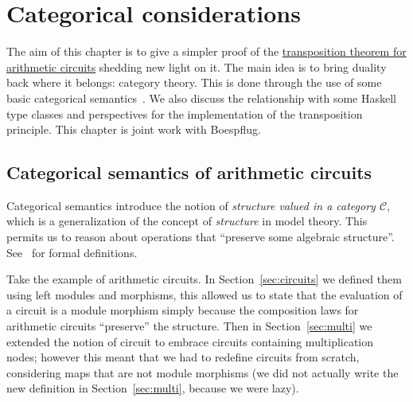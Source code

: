 

\chapter{Categorical considerations}
\label{cha:basic-categ-theory}

\renewcommand{\C}{\mathcal{C}}
\newcommand{\D}{\mathcal{D}}
\newcommand{\Set}{\mathbold{S\kern-0.2ex e\kern-0.2ex t}}
\newcommand{\Hask}{\mathbold{H\kern-0.2ex a\kern-0.2ex s\kern-0.2ex k}}
\newcommand{\RMod}[1]{#1\mathbold{-M\kern-0.2ex o\kern-0.2ex d}}

The aim of this chapter is to give a simpler proof of the
\hyperref[th:tellegen]{transposition theorem for arithmetic circuits}
shedding new light on it. The main idea is to bring duality back where
it belongs: category theory. This is done through the use of some
basic categorical semantics~\cite{pitts01,asperti+longo}. We also
discuss the relationship with some Haskell type classes and
perspectives for the implementation of the transposition
principle. This chapter is joint work with Boespflug.



\section{Categorical semantics of arithmetic circuits}
\label{sec:categ-semant-arithm}
Categorical semantics introduce the
notion of \emph{structure valued
  in a category $\C$}, which is a generalization of the concept of
\emph{structure} in model theory. This permits us to
reason about operations that ``preserve some algebraic structure''.
See~\cite{pitts01} for formal definitions.

Take the example of arithmetic circuits. In
Section~\ref{sec:circuits} we defined them using left modules and
morphisms, this allowed us to state that the evaluation of a circuit
is a module morphism simply because the composition laws for
arithmetic circuits ``preserve'' the structure. Then in
Section~\ref{sec:multi} we extended the notion of circuit to embrace
circuits containing multiplication nodes; however this meant that we
had to redefine circuits from scratch, considering maps that are not
module morphisms (we did not actually write the new definition in
Section~\ref{sec:multi}, because we were lazy).

